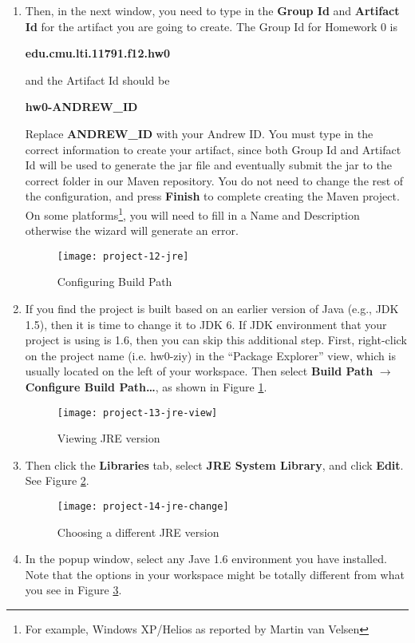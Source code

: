 \begin{enumerate}
\item Then, in the next window, you need to type in the \textbf{Group Id} and
\textbf{Artifact Id} for the artifact you are going to create. The Group Id for
Homework 0 is

\begin{center}
\textbf{edu.cmu.lti.11791.f12.hw0}
\end{center}

and the Artifact Id should be

\begin{center}
\textbf{hw0-ANDREW\_ID}
\end{center}

Replace \textbf{ANDREW\_ID} with your Andrew ID. You must type in the correct
information to create your artifact, since both Group Id and Artifact Id will be
used to generate the jar file and eventually submit the jar to the correct
folder in our Maven repository. You do not need to change the rest of the
configuration, and press \textbf{Finish} to complete creating the Maven project.
On some platforms\footnote{For example, Windows XP/Helios as reported by Martin
van Velsen}, you will need to fill in a Name and Description otherwise the
wizard will generate an error.

\begin{figure}[t]
\centering
\texttt{[image: project-12-jre]}
\caption{Configuring Build Path\label{project-12-jre}}
\end{figure}

\item If you find the project is built based on an earlier version of Java
(e.g., JDK 1.5), then it is time to change it to JDK 6. If JDK environment that
your project is using is 1.6, then you can skip this additional step. First,
right-click on the project name (i.e. hw0-ziy) in the ``Package Explorer'' view,
which is usually located on the left of your workspace. Then select
\textbf{Build Path} $\rightarrow$ \textbf{Configure Build Path\ldots}, as shown
in Figure \ref{project-12-jre}.

\begin{figure}[t]
\centering
\texttt{[image: project-13-jre-view]}
\caption{Viewing JRE version\label{project-13-jre-view}}
\end{figure}

\item Then click the \textbf{Libraries} tab, select \textbf{JRE System Library},
and click \textbf{Edit}. See Figure \ref{project-13-jre-view}.

\begin{figure}[t]
\centering
\texttt{[image: project-14-jre-change]}
\caption{Choosing a different JRE version\label{project-14-jre-change}}
\end{figure}

\item In the popup window, select any Jave 1.6 environment you have installed.
Note that the options in your workspace might be totally different from what you
see in Figure \ref{project-14-jre-change}.

\end{enumerate}

